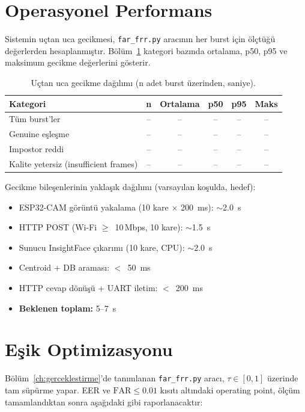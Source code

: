 \section{Operasyonel Performans}
\label{sec:perf}

Sistemin uçtan uca gecikmesi, \texttt{far\_frr.py} aracının her burst için
ölçtüğü değerlerden hesaplanmıştır. Bölüm~\ref{tab:results-latency} kategori
bazında ortalama, p50, p95 ve maksimum gecikme değerlerini gösterir.

\begin{table}[h!]
\centering
\caption{Uçtan uca gecikme dağılımı (n adet burst üzerinden, saniye).}
\label{tab:results-latency}
\small
\begin{tabular}{l c c c c c}
\toprule
\textbf{Kategori} & \textbf{n} & \textbf{Ortalama} & \textbf{p50} & \textbf{p95} & \textbf{Maks}\\
\midrule
Tüm burst'ler                          & -- & -- & -- & -- & --\\
Genuine eşleşme                         & -- & -- & -- & -- & --\\
Impostor reddi                          & -- & -- & -- & -- & --\\
Kalite yetersiz (insufficient frames)   & -- & -- & -- & -- & --\\
\bottomrule
\end{tabular}
\end{table}

Gecikme bileşenlerinin yaklaşık dağılımı (varsayılan koşulda, hedef):

\begin{itemize}
    \item ESP32-CAM görüntü yakalama (10 kare $\times$ 200~ms): $\sim$2.0~s
    \item HTTP POST (Wi-Fi $\geq$~10\,Mbps, 10 kare): $\sim$1.5~s
    \item Sunucu InsightFace çıkarımı (10 kare, CPU): $\sim$2.0~s
    \item Centroid + DB araması: $<$~50~ms
    \item HTTP cevap dönüşü + UART iletim: $<$~200~ms
    \item \textbf{Beklenen toplam:} 5--7~s
\end{itemize}

\section{Eşik Optimizasyonu}

Bölüm~\ref{ch:gerceklestirme}'de tanımlanan \texttt{far\_frr.py} aracı,
$\tau \in [0, 1]$ üzerinde tam süpürme yapar. EER ve $\mathrm{FAR} \leq 0.01$
kısıtı altındaki operating point, ölçüm tamamlandıktan sonra
aşağıdaki gibi raporlanacaktır:

